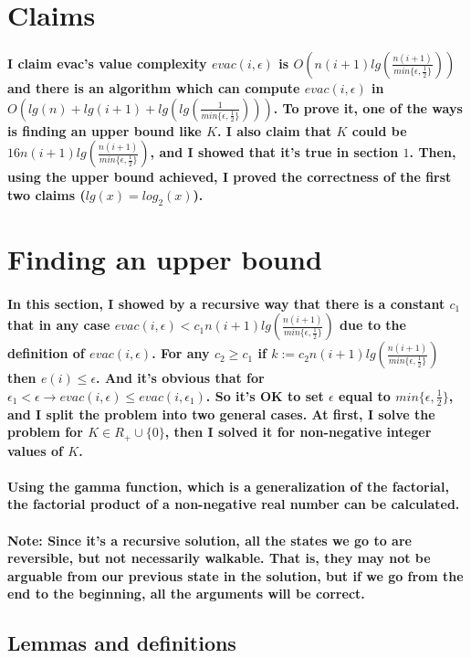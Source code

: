 \documentclass[oneside]{book}
\newcommand{\myparagraph}[1]{\paragraph{\textnormal{#1}}}
\begin{document}
\small

\section*{Claims}

\myparagraph{
I claim evac's value complexity $evac(i, \epsilon)$ is $O(n(i+1)lg(\frac{n(i+1)}{min\{\epsilon, \frac{1}{2}\}}))$ and there is an algorithm which can compute $evac(i, \epsilon)$ in $O(lg(n)+lg(i+1)+lg(lg(\frac{1}{min\{\epsilon, \frac{1}{2}\}})))$. To prove it, one of the ways is finding an upper bound like $K$. I also claim that $K$ could be $16n(i+1)lg(\frac{n(i+1)}{min\{\epsilon, \frac{1}{2}\}})$, and I showed that it's true in section $1$. Then, using the upper bound achieved, I proved the correctness of the first two claims ($lg(x) = log_2(x)$).
}

\section{Finding an upper bound}

\myparagraph{
In this section, I showed by a recursive way that there is a constant $c_1$ that in any case $evac(i, \epsilon) < c_1 n(i+1)lg(\frac{n(i+1)}{min\{\epsilon, \frac{1}{2}\}})$ due to the definition of $evac(i, \epsilon)$. For any $c_2 \ge c_1$ if $k := c_2 n(i+1)lg(\frac{n(i+1)}{min\{\epsilon, \frac{1}{2}\}})$ then $e(i) \le \epsilon$. And it's obvious that for $\epsilon_1 < \epsilon \rightarrow evac(i, \epsilon) \le evac(i, \epsilon_1)$. So it's OK to set $\epsilon$ equal to $min\{\epsilon, \frac{1}{2}\}$, and I split the problem into two general cases. At first, I solve the problem for $K \in R_+ \cup \{0\}$, then I solved it for non-negative integer values of $K$.
}

\myparagraph{
Using the gamma function, which is a generalization of the factorial, the factorial product of a non-negative real number can be calculated.
}

\myparagraph{
\textbf{Note:} Since it's a recursive solution, all the states we go to are reversible, but not necessarily walkable. That is, they may not be arguable from our previous state in the solution, but if we go from the end to the beginning, all the arguments will be correct.
}

\subsection{Lemmas and definitions}
\end{document}
